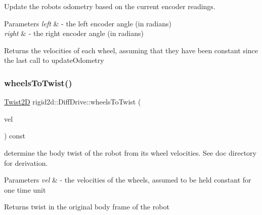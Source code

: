 Update the robot\textquotesingle{}s odometry based on the current encoder readings. 


\begin{DoxyParams}{Parameters}
{\em left} & -\/ the left encoder angle (in radians) \\
\hline
{\em right} & -\/ the right encoder angle (in radians) \\
\hline
\end{DoxyParams}
\begin{DoxyReturn}{Returns}
the velocities of each wheel, assuming that they have been constant since the last call to update\+Odometry 
\end{DoxyReturn}
\mbox{\label{classrigid2d_1_1DiffDrive_a34f3a4df7a14565563a6b56d8eef2b9b}} 
\subsubsection{\texorpdfstring{wheels\+To\+Twist()}{wheelsToTwist()}}
{\footnotesize\ttfamily \hyperlink{structrigid2d_1_1Twist2D}{Twist2D} rigid2d\+::\+Diff\+Drive\+::wheels\+To\+Twist (\begin{DoxyParamCaption}\item[{\hyperlink{structrigid2d_1_1WheelVelocities}{Wheel\+Velocities}}]{vel }\end{DoxyParamCaption}) const}



determine the body twist of the robot from its wheel velocities. See doc directory for derivation. 


\begin{DoxyParams}{Parameters}
{\em vel} & -\/ the velocities of the wheels, assumed to be held constant for one time unit \\
\hline
\end{DoxyParams}
\begin{DoxyReturn}{Returns}
twist in the original body frame of the robot 
\end{DoxyReturn}
\mbox{\label{classrigid2d_1_1DiffDrive_a4153bdc614be0535b88d5e43461df7dc}} 
